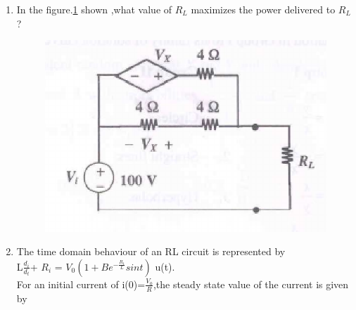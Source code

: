 \documentclass[journal,12pt,twocolumn]{IEEEtran}
\begin{document}
\begin{enumerate}
\item  In the figure.\ref{fig75} shown ,what value of $R_{L}$ maximizes the power delivered to $R_{L}$ ?
\begin{enumerate}
\setlength\itemsep{2em}
\begin{figure}[!h]
\begin{center}
\includegraphics[scale=0.9]{./figs/fig75.eps}
\caption{}
\label{fig75}
\end{center}
\end{figure}
\end{enumerate}

\item The time domain behaviour of an RL circuit is represented by\\ L$\frac{d_{i}} {d_{t}}$+ $R_{i}$ = $V_{0}(1+Be^{-\frac{R_{t}}{L}}sint)$ u(t).\\For an initial current of i(0)=$\frac{V_{0}}{R}$,the steady state value of the current is given by
\begin{enumerate}
\setlength\itemsep{2em}
\end{enumerate}


\end{enumerate}
\end{document}
